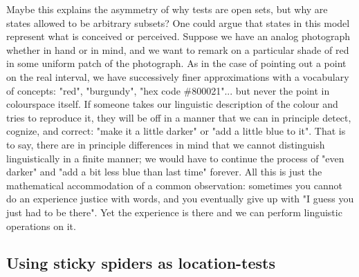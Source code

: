 Maybe this explains the asymmetry of why tests are open sets, but why are states allowed to be arbitrary subsets? One could argue that states in this model represent what is conceived or perceived. Suppose we have an analog photograph whether in hand or in mind, and we want to remark on a particular shade of red in some uniform patch of the photograph. As in the case of pointing out a point on the real interval, we have successively finer approximations with a vocabulary of concepts: "red", "burgundy", "hex code \#800021"... but never the point in colourspace itself. If someone takes our linguistic description of the colour and tries to reproduce it, they will be off in a manner that we can in principle detect, cognize, and correct: "make it a little darker" or "add a little blue to it". That is to say, there are in principle differences in mind that we cannot distinguish linguistically in a finite manner; we would have to continue the process of "even darker" and "add a bit less blue than last time" forever. All this is just the mathematical accommodation of a common observation: sometimes you cannot do an experience justice with words, and you eventually give up with "I guess you just had to be there". Yet the experience is there and we can perform linguistic operations on it.

\clearpage

\subsection{Using sticky spiders as location-tests}

